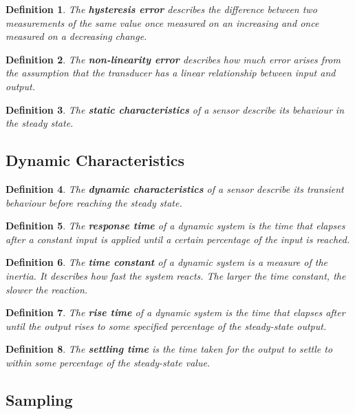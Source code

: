 \documentclass[10pt,a4paper]{scrartcl}
\newtheorem{define}{Definition}
\begin{document}
\begin{multicols*}{2}
\begin{define}
The \textbf{hysteresis error} describes the difference between two measurements of the same value once measured on an increasing and once measured on a decreasing change.
\end{define}

\begin{define}
The \textbf{non-linearity error} describes how much error arises from the assumption that the transducer has a linear relationship between input and output.
\end{define}

\begin{define}
The \textbf{static characteristics} of a sensor describe its behaviour in the steady state.
\end{define}

\subsection{Dynamic Characteristics}

\begin{define}
The \textbf{dynamic characteristics} of a sensor describe its transient behaviour before reaching the steady state.\end{define}

\begin{define}
The \textbf{response time} of a dynamic system is the time that elapses after a constant input is applied until a certain percentage of the input is reached.
\end{define}

\begin{define}
The \textbf{time constant} of a dynamic system is a measure of the inertia. It describes how fast the system reacts. The larger the time constant, the slower the reaction.
\end{define}

\begin{define}
The \textbf{rise time} of a dynamic system is the time that elapses after until the output rises to some specified percentage of the steady-state output. 
\end{define}

\begin{define}
The \textbf{settling time} is the time taken for the output to settle to within some percentage of the steady-state value.
\end{define}

\subsection{Sampling}


\end{multicols*}
\end{document}
